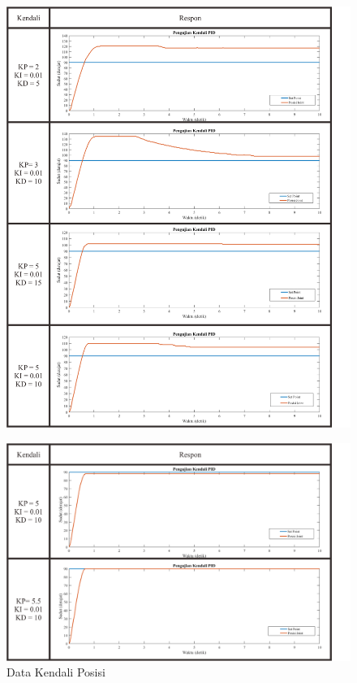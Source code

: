 \begin{figure}[H]
	\centering
	\includegraphics[width=13cm]{gambar/kendali2.png}
\end{figure}

\begin{figure}[H]
	\centering
	\includegraphics[width=13cm]{gambar/kendali3.png}
	\caption{Data Kendali Posisi}
	\label{pic.kendali}
\end{figure}

